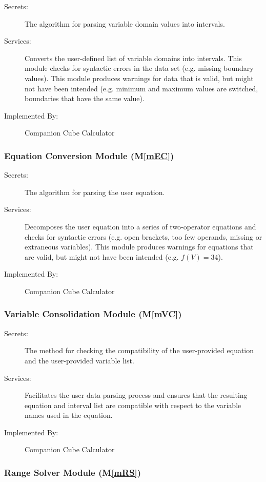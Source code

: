 \documentclass[12pt, titlepage]{article}
\newcommand{\mref}[1]{M\ref{#1}}
\newcommand{\progname}{Companion Cube Calculator} %
\begin{document}
\begin{description}
	\item[Secrets:]The algorithm for parsing variable domain values into 
	intervals.
	\item[Services:]Converts the user-defined list of variable domains into 
	intervals. This module checks for syntactic errors in the data set (e.g. 
	missing boundary values). This module produces warnings for data that is 
	valid, but might not have been intended (e.g. minimum and maximum values 
	are switched, boundaries that have the same value).
	\item[Implemented By:] \progname{}
\end{description}

\subsubsection{Equation Conversion Module (\mref{mEC})}

\begin{description}
	\item[Secrets:]The algorithm for parsing the user equation.
	\item[Services:]Decomposes the user equation into a series of two-operator 
	equations and checks for syntactic errors (e.g. open brackets, too few 
	operands, missing or extraneous variables). This module produces warnings 
	for equations that are valid, but might not have been intended (e.g. $f(V) 
	= 34$).
	\item[Implemented By:] \progname{}
\end{description}

\subsubsection{Variable Consolidation Module (\mref{mVC})}

\begin{description}
	\item[Secrets:] The method for checking the compatibility of the 
	user-provided equation and the user-provided variable list.
	\item[Services:] Facilitates the user data parsing process and ensures that 
	the resulting equation and interval list are compatible with respect to the 
	variable names used in the equation.
	\item[Implemented By:] \progname{}
\end{description}

\subsubsection{Range Solver Module (\mref{mRS})}
\end{document}
